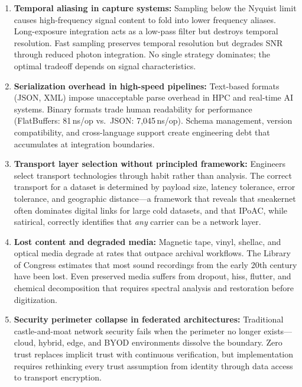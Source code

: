 \documentclass[11pt,letterpaper]{article}
\begin{document}
\begin{enumerate}[leftmargin=*, label=\textbf{P\arabic*.}]
\item \textbf{Temporal aliasing in capture systems:} Sampling below the Nyquist limit causes high-frequency signal content to fold into lower frequency aliases. Long-exposure integration acts as a low-pass filter but destroys temporal resolution. Fast sampling preserves temporal resolution but degrades SNR through reduced photon integration. No single strategy dominates; the optimal tradeoff depends on signal characteristics.

\item \textbf{Serialization overhead in high-speed pipelines:} Text-based formats (JSON, XML) impose unacceptable parse overhead in HPC and real-time AI systems. Binary formats trade human readability for performance (FlatBuffers: 81\,ns/op vs.\ JSON: 7,045\,ns/op). Schema management, version compatibility, and cross-language support create engineering debt that accumulates at integration boundaries.

\item \textbf{Transport layer selection without principled framework:} Engineers select transport technologies through habit rather than analysis. The correct transport for a dataset is determined by payload size, latency tolerance, error tolerance, and geographic distance---a framework that reveals that sneakernet often dominates digital links for large cold datasets, and that IPoAC, while satirical, correctly identifies that \emph{any} carrier can be a network layer.

\item \textbf{Lost content and degraded media:} Magnetic tape, vinyl, shellac, and optical media degrade at rates that outpace archival workflows. The Library of Congress estimates that most sound recordings from the early 20th century have been lost. Even preserved media suffers from dropout, hiss, flutter, and chemical decomposition that requires spectral analysis and restoration before digitization.

\item \textbf{Security perimeter collapse in federated architectures:} Traditional castle-and-moat network security fails when the perimeter no longer exists---cloud, hybrid, edge, and BYOD environments dissolve the boundary. Zero trust replaces implicit trust with continuous verification, but implementation requires rethinking every trust assumption from identity through data access to transport encryption.
\end{enumerate}
\end{document}
